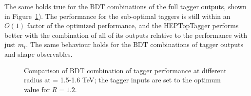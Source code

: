 The same holds true for the BDT combinations of the full tagger outputs, shown in Figure~\ref{fig:Rcomparison_top_optOnce}). The performance for the sub-optimal taggers is still within an $O(1)$ factor of the optimized performance, and the HEPTopTagger performs better with the combination of all of its outputs relative to the performance with just $m_t$. The same behaviour holds for the BDT combinations of tagger outputs and shape observables. \\


\begin{figure}
\centering
{}
\caption{Comparison of BDT combination of tagger performance at different radius at \pt = 1.5-1.6 TeV; the tagger inputs are set to the optimum value for $R=1.2$.}
\label{fig:Rcomparison_top_optOnce}
\end{figure}


